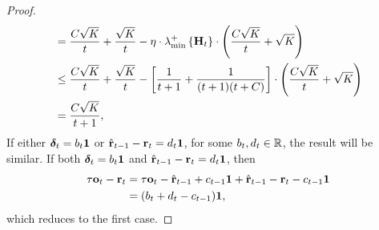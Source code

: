 \begin{proof}
\begin{equation*}
\begin{split}
    &= \frac{C \sqrt{K}}{t} + \frac{\sqrt{K}}{t} - \eta \cdot \lambda_{\min}^{+}\left\{ {\mathbf{H}}_t \right\} \cdot \left( \frac{C \sqrt{K}}{t} + \sqrt{K} \right) \\
    &\le \frac{C \sqrt{K}}{t} + \frac{\sqrt{K}}{t} - \left[ \frac{1}{t+1} + \frac{1}{(t+1)(t+C)} \right] \cdot \left( \frac{C \sqrt{K}}{t} + \sqrt{K} \right) \\
    &= \frac{C \sqrt{K}}{t+1},
\end{split}
\end{equation*}
If either ${\boldsymbol{\delta}}_t = b_t {\mathbf{1}}$ or $\hat{{\mathbf{r}}}_{t-1} - {\mathbf{r}}_t = d_t {\mathbf{1}}$, for some $b_t, d_t \in {\mathbb{R}}$, the result will be similar. If both ${\boldsymbol{\delta}}_t = b_t {\mathbf{1}}$ and $\hat{{\mathbf{r}}}_{t-1} - {\mathbf{r}}_t = d_t {\mathbf{1}}$, then
\begin{equation*}
\begin{split}
    \tau {\mathbf{o}}_t - {\mathbf{r}}_t &= \tau {\mathbf{o}}_{t} - \hat{{\mathbf{r}}}_{t-1} + c_{t-1} {\mathbf{1}} + \hat{{\mathbf{r}}}_{t-1} - {\mathbf{r}}_t - c_{t-1} {\mathbf{1}} \\
    &= (b_t + d_t - c_{t-1}) {\mathbf{1}},
\end{split}
\end{equation*}
which reduces to the first case.
\end{proof}

